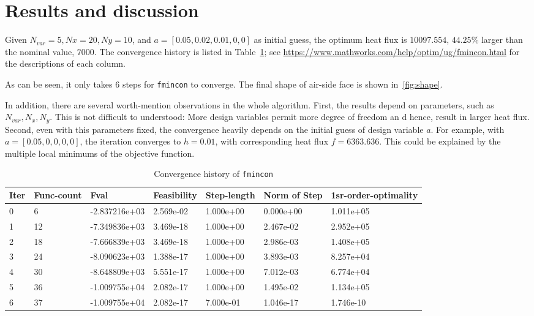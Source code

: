 \documentclass[a4paper]{article}
\begin{document}
\section{Results and discussion}
 Given $N_{var}=5, Nx=20, Ny=10$, and $a=[0.05,0.02,0.01,0,0]$ as initial guess, the optimum heat flux is $10097.554$, $44.25\%$ larger than the nominal value, $7000$. The convergence history is listed in Table~\ref{tb:conv_his}; see \url{https://www.mathworks.com/help/optim/ug/fmincon.html} for the descriptions of each column. 

As can be seen, it only takes $6$ steps for \texttt{fmincon} to converge. The final shape of air-side face is shown in~\ref{fig:shape}.

In addition, there are several worth-mention observations in the whole algorithm. First, the results depend on parameters, such as $N_{var}, N_x, N_y$. This is not difficult to understood: More design variables permit more degree of freedom an d hence, result in larger heat flux. Second, even with this parameters fixed, the convergence heavily depends on the initial guess of design variable $a$. For example, with $a=[0.05, 0,0,0,0]$, the iteration converges to $h=0.01$, with corresponding heat flux $f=6363.636$. This could be explained by the multiple local minimums of the objective function.
\begin{table}[h]
  \begin{center}
    \caption[]{Convergence history of \texttt{fmincon}} \label{tb:conv_his}
     \begin{tabular}{p{}p{}p{}p{}p{}p{}p{}}
       \hline
       Iter&      Func-count    & Fval       & Feasibility & Step-length & Norm of Step & 1sr-order-optimality \\
        \hline
       0 &          6 &  -2.837216e+03 &    2.569e-02 &    1.000e+00  &   0.000e+00  &   1.011e+05 \\
        1&          12&   -7.349836e+03&     3.469e-18&     1.000e+00 &    2.467e-02 &    2.952e+05\\
        2&          18&   -7.666839e+03&     3.469e-18&     1.000e+00 &    2.986e-03 &    1.408e+05\\
        3&          24&   -8.090623e+03&     1.388e-17&     1.000e+00 &    3.893e-03 &    8.257e+04\\
        4&          30&   -8.648809e+03&     5.551e-17&     1.000e+00 &    7.012e-03 &    6.774e+04\\
        5&          36&   -1.009755e+04&     2.082e-17&     1.000e+00 &    1.495e-02 &    1.134e+05\\
        6&          37&   -1.009755e+04&     2.082e-17&     7.000e-01 &    1.046e-17 &    1.746e-10\\  
        \hline
     \end{tabular}
  \end{center}
\end{table}
\end{document}
